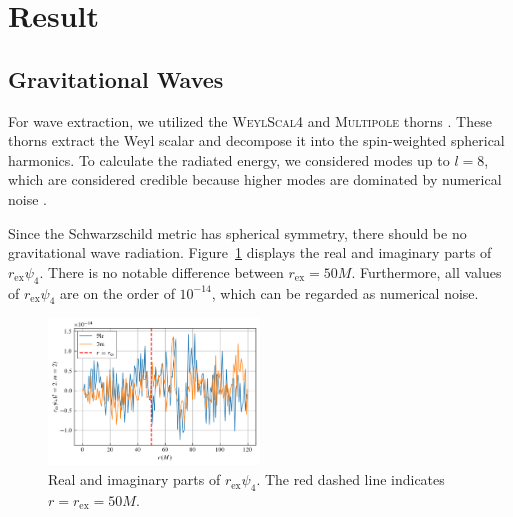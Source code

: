 \documentclass[%
 reprint,
 amsmath,amssymb,
 aps,
 prd,
]{revtex4-2}
\begin{document}
\section{Result}

\subsection{Gravitational Waves}

For wave extraction, we utilized the \textsc{WeylScal4} and \textsc{Multipole} thorns \cite{Baker:2001sf}. These thorns extract the Weyl scalar and decompose it into the spin-weighted spherical harmonics. To calculate the radiated energy, we considered modes up to $l=8$, which are considered credible because higher modes are dominated by numerical noise \cite{Pollney:2009yz}.

Since the Schwarzschild metric has spherical symmetry, there should be no gravitational wave radiation. Figure~\ref{fig:psi4_r50} displays the real and imaginary parts of $r_\mathrm{ex}\psi_4$. There is no notable difference between $r_\mathrm{ex} = 50M$. Furthermore, all values of $r_\mathrm{ex}\psi_4$ are on the order of $10^{-14}$, which can be regarded as numerical noise.

\begin{figure}[h]
	\includegraphics[width=0.5\textwidth]{data/psi4_r50.png}%
	\caption{\label{fig:psi4_r50} Real and imaginary parts of $r_\mathrm{ex}\psi_4$. The red dashed line indicates $r=r_\mathrm{ex}=50M$.}
\end{figure}
\end{document}
